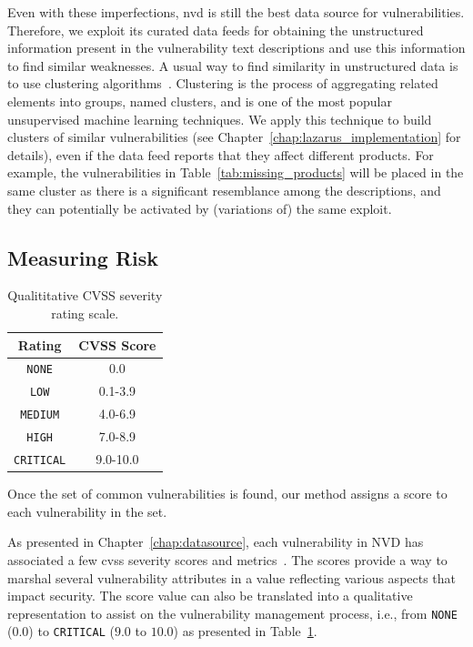 Even with these imperfections, \gls{nvd} is still the best data source for vulnerabilities.
Therefore, we exploit its curated data feeds for obtaining the unstructured information present in the vulnerability text descriptions and use this information to find similar weaknesses.
A usual way to find similarity in unstructured data is to use clustering algorithms~\cite{Jain:2010}.
Clustering is the process of aggregating related elements into groups, named clusters, and is one of the most popular unsupervised machine learning techniques. 
We apply this technique to build clusters of similar vulnerabilities (see Chapter~\ref{chap:lazarus_implementation} for details), even if the data feed reports that they affect different products.
For example, the vulnerabilities in Table~\ref{tab:missing_products} will be placed in the same cluster as there is a significant resemblance among the descriptions, and they can potentially be activated by (variations of) the same exploit.


\subsection{Measuring Risk}
\label{sec:measurerisk}


\begin{table}[t]
\begin{center}
{\small
\begin{tabular}{| c | c | }\hline
\textbf{Rating} & \textbf{CVSS Score} \\\hline\hline
\texttt{NONE} & 0.0 \\
\texttt{LOW} & 0.1-3.9 \\
\texttt{MEDIUM} & 4.0-6.9 \\
\texttt{HIGH} & 7.0-8.9 \\
\texttt{CRITICAL} & 9.0-10.0 \\ \hline
\end{tabular}
}
\vspace{2mm}
\caption{Qualititative CVSS severity rating scale.}
\label{tab:cvss_scale}
\end{center}
\end{table}

Once the set of common vulnerabilities is found, our method assigns a score to each vulnerability in the set.

As presented in Chapter~\ref{chap:datasource}, each vulnerability in NVD has associated a few \gls{cvss} severity scores and metrics~\cite{cvssv3}.
The scores provide a way to marshal several vulnerability attributes in a value reflecting various aspects that impact security. 
The score value can also be translated into a qualitative representation to assist on the vulnerability management process, i.e., from \texttt{NONE} ($0.0$) to \texttt{CRITICAL} ($9.0$ to $10.0$) as presented in Table~\ref{tab:cvss_scale}.

